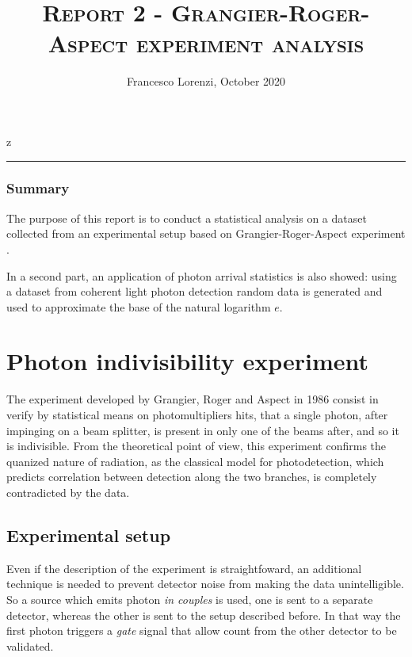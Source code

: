 \documentclass[10pt, final]{article}
\title{\textsc{Report 2 - Grangier-Roger-Aspect experiment analysis}}
\author{Francesco Lorenzi,      October 2020}
\date{}
\begin{document}
z
\maketitle
\vspace{-25pt}

\begin{center}
	\rule[0pt]{400pt}{0.5pt}
\end{center}
\vspace{-15pt}

\begin{multicols}{2}
\subsubsection*{Summary}
The purpose of this report is to conduct a statistical analysis on a dataset collected from an experimental setup based on Grangier-Roger-Aspect experiment \cite{grangier}. 

In a second part, an application of photon arrival statistics is also showed: using a dataset from coherent light photon detection random data is generated and used to approximate the base of the natural logarithm $e$.

\section{Photon indivisibility experiment}
The experiment developed by Grangier, Roger and Aspect in 1986 consist in verify by statistical means on photomultipliers hits, that a single  photon, after impinging on a beam splitter, is present in only one of the beams after, and so it is indivisible. 
From the theoretical point of view, this experiment confirms the quanized nature of radiation, as the classical model for photodetection, which predicts correlation between detection along the two branches, is completely contradicted by the data.
\subsection*{Experimental setup}
Even if the description of the experiment is straightfoward, an additional technique is needed to prevent detector noise from making the data unintelligible.
So a source which emits photon \emph{in couples} is used, one is sent to a separate detector, whereas the other is sent to the setup described before. In that way the first photon triggers a \emph{gate} signal that allow count from the other detector to be validated.


\end{multicols}
\end{document}
